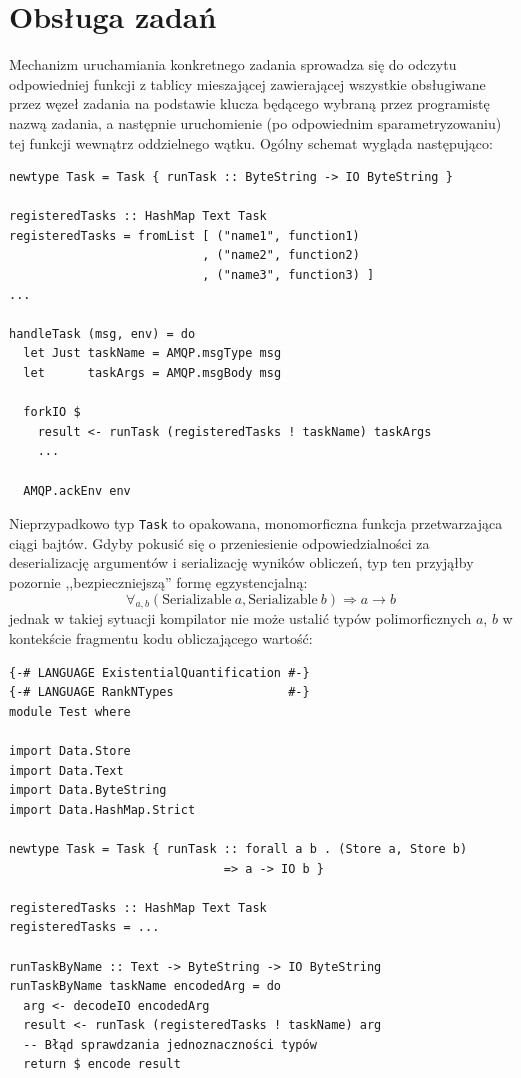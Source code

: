\section{Obsługa zadań}
Mechanizm uruchamiania konkretnego zadania sprowadza się do odczytu odpowiedniej funkcji z tablicy mieszającej zawierającej wszystkie obsługiwane przez węzeł zadania na podstawie klucza będącego wybraną przez programistę nazwą zadania, a następnie uruchomienie (po odpowiednim sparametryzowaniu) tej funkcji wewnątrz oddzielnego wątku. Ogólny schemat wygląda następująco:

\begin{lstlisting}[caption=Schemat obsługi zadania]
newtype Task = Task { runTask :: ByteString -> IO ByteString }

registeredTasks :: HashMap Text Task
registeredTasks = fromList [ ("name1", function1)
                           , ("name2", function2)
                           , ("name3", function3) ]
...

handleTask (msg, env) = do
  let Just taskName = AMQP.msgType msg
  let      taskArgs = AMQP.msgBody msg

  forkIO $
    result <- runTask (registeredTasks ! taskName) taskArgs
    ...
  
  AMQP.ackEnv env
\end{lstlisting}
Nieprzypadkowo typ \lstinline{Task} to opakowana, monomorficzna funkcja przetwarzająca ciągi bajtów. Gdyby pokusić się o przeniesienie odpowiedzialności za deserializację argumentów i serializację wyników obliczeń, typ ten przyjąłby pozornie ,,bezpieczniejszą'' formę egzystencjalną:
{\large $$\forall_{a, b} (\mathrm{Serializable}\ a, \mathrm{Serializable}\ b) \Rightarrow a \rightarrow b$$}%
jednak w takiej sytuacji kompilator nie może ustalić typów polimorficznych $a$, $b$ w kontekście fragmentu kodu obliczającego wartość:
\newpage
\begin{lstlisting}[caption=Problem typu zadania zdefiniowanego egzystencjalnie]
{-# LANGUAGE ExistentialQuantification #-}
{-# LANGUAGE RankNTypes                #-}
module Test where

import Data.Store
import Data.Text
import Data.ByteString
import Data.HashMap.Strict

newtype Task = Task { runTask :: forall a b . (Store a, Store b) 
                              => a -> IO b }

registeredTasks :: HashMap Text Task
registeredTasks = ...

runTaskByName :: Text -> ByteString -> IO ByteString
runTaskByName taskName encodedArg = do
  arg <- decodeIO encodedArg
  result <- runTask (registeredTasks ! taskName) arg
  -- Błąd sprawdzania jednoznaczności typów
  return $ encode result
  
\end{lstlisting}

